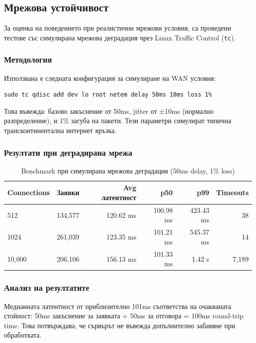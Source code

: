 \subsection{Мрежова устойчивост}

За оценка на поведението при реалистични мрежови условия, са проведени тестове със симулирана мрежова деградация чрез Linux Traffic Control (\texttt{tc}).

\subsubsection{Методология}

Използвана е следната конфигурация за симулиране на WAN условия:
\begin{verbatim}
sudo tc qdisc add dev lo root netem delay 50ms 10ms loss 1%
\end{verbatim}

Това въвежда: базово закъснение от 50ms, jitter от ±10ms (нормално разпределение), и 1\% загуба на пакети. Тези параметри симулират типична трансконтинентална интернет връзка.

\subsubsection{Резултати при деградирана мрежа}

\begin{table}[H]
\centering
\caption{Benchmark при симулирана мрежова деградация (50ms delay, 1\% loss)}
\label{tab:hostile_network}
\begin{tabular}{|l|r|r|r|r|r|}
\hline
\textbf{Connections} & \textbf{Заявки} & \textbf{Avg латентност} & \textbf{p50} & \textbf{p99} & \textbf{Timeouts} \\
\hline
512 & 134,577 & 120.62 ms & 100.98 ms & 423.43 ms & 38 \\
1024 & 261,039 & 123.35 ms & 101.21 ms & 545.37 ms & 14 \\
10,000 & 206,106 & 156.13 ms & 101.33 ms & 1.42 s & 7,189 \\
\hline
\end{tabular}
\end{table}

\subsubsection{Анализ на резултатите}

Медианната латентност от приблизително 101ms съответства на очакваната стойност: 50ms закъснение за заявката + 50ms за отговора = 100ms round-trip time. Това потвърждава, че сървърът не въвежда допълнително забавяне при обработката.

